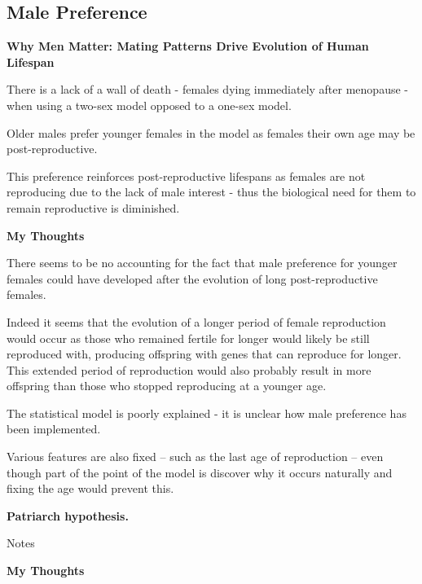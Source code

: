\documentclass[authoryearcitations]{UoYCSproject}
\begin{document}
\subsection{Male Preference}
\begin{framed}
\noindent \textbf{Why Men Matter: Mating Patterns Drive Evolution of Human Lifespan \cite{whyMenMatter2007}}

There is a lack of a wall of death - females dying immediately after menopause - when using a two-sex model opposed to a one-sex model.

Older males prefer younger females in the model as females their own age may be post-reproductive.

This preference reinforces post-reproductive lifespans as females are not reproducing due to the lack of male interest - thus the biological need for them to remain reproductive is diminished.

\noindent \textbf{My Thoughts}

There seems to be no accounting for the fact that male preference for younger females could have developed after the evolution of long post-reproductive females.

Indeed it seems that the evolution of a longer period of female reproduction would occur as those who remained fertile for longer would likely be still reproduced with, producing offspring with genes that can reproduce for longer. This extended period of reproduction would also probably result in more offspring than those who stopped reproducing at a younger age.

The statistical model is poorly explained - it is unclear how male preference has been implemented.

Various features are also fixed -- such as the last age of reproduction -- even though part of the point of the model is discover why it occurs naturally and fixing the age would prevent this.
\end{framed}

\begin{framed}
\noindent \textbf{Patriarch hypothesis. \cite{patriarchHypothesis2000}}

Notes

\noindent \textbf{My Thoughts}


\end{framed}
\end{document}
